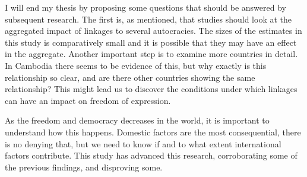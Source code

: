 I will end my thesis by proposing some questions that should be answered by subsequent research. The first is, as mentioned, that studies should look at the aggregated impact of linkages to several autocracies. The sizes of the estimates in this study is comparatively small and it is possible that they may have an effect in the aggregate. Another important step is to examine more countries in detail. In Cambodia there seems to be evidence of this, but why exactly is this relationship so clear, and are there other countries showing the same relationship? This might lead us to discover the conditions under which linkages can have an impact on freedom of expression.

As the freedom and democracy decreases in the world, it is important to understand how this happens. Domestic factors are the most consequential, there is no denying that, but we need to know if and to what extent international factors contribute. This study has advanced this research, corroborating some of the previous findings, and disproving some. 